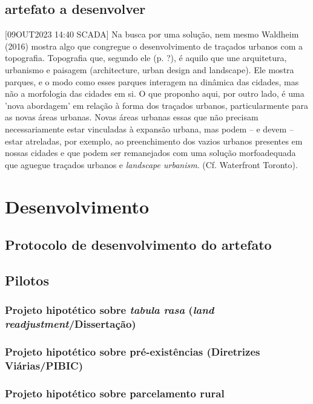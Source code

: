 \documentclass[12pt, a4paper]{book} %
\begin{document}
        \chapter[A escolha de uma solução]{artefato a desenvolver}

        [09OUT2023 14:40 SCADA] Na busca por uma solução, nem mesmo Waldheim (2016) mostra algo que congregue o desenvolvimento de traçados urbanos com a topografia. Topografia que, segundo ele (p. ?), é aquilo que une arquitetura, urbanismo e paisagem (architecture, urban design and landscape). Ele mostra parques, e o modo como esses parques interagem na dinâmica das cidades, mas não a morfologia das cidades em si.
        O que proponho aqui, por outro lado, é uma 'nova abordagem' em relação à forma dos traçados urbanos, particularmente para as novas áreas urbanas. Novas áreas urbanas essas que não precisam necessariamente estar vinculadas à expansão urbana, mas podem – e devem – estar atreladas, por exemplo, ao preenchimento dos vazios urbanos presentes em nossas cidades e que podem ser remanejados com uma solução morfoadequada que aguegue traçados urbanos e \textit{landscape urbanism}. (Cf. Waterfront Toronto).

    \part[Desenvolvimento]{Desenvolvimento}

        \chapter[Protocolo]{Protocolo de desenvolvimento do artefato}

        \chapter[O projeto de traçados hipotéticos]{Pilotos}
            
            \section{Projeto hipotético sobre \textit{tabula rasa} (\textit{land readjustment}/Dissertação)}
            \section{Projeto hipotético sobre pré-existências (Diretrizes Viárias/PIBIC)}
            \section{Projeto hipotético sobre parcelamento rural}
\end{document}
